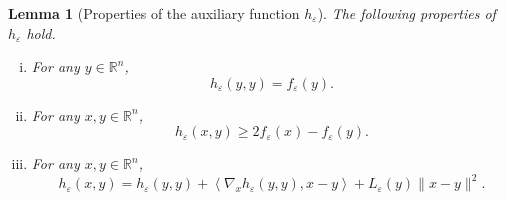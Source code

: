 \documentclass[11pt]{article}
\numberwithin{equation}{section}
\newtheorem{lemma}{Lemma}[proposition]
\begin{document}
\begin{lemma} [Properties of the auxiliary function $h_{\varepsilon}$]\label{State_h_prop}
The following properties of $h_{\varepsilon}$ hold.
\begin{enumerate}[(i)]
	\item For any $y \in \mathbb{R}^n$, \label{State_h_prop1}
	\begin{equation*}
		h_{\varepsilon}(y,y) = f_{\varepsilon}(y) .
	\end{equation*}
	\item For any $x,y \in \mathbb{R}^n$, \label{State_h_prop2}
	\begin{equation*}
		h_{\varepsilon}(x,y) \geq 2f_{\varepsilon}(x) - f_{\varepsilon}(y) .
	\end{equation*}
	\item For any $x,y \in \mathbb{R}^n$, \label{State_h_prop4}
	\begin{equation*}
		h_{\varepsilon}(x,y) = h_{\varepsilon}(y,y) + \left\langle \nabla_x h_{\varepsilon}(y,y) , x-y \right\rangle + L_{\varepsilon}(y) \|x-y\|^2 .
	\end{equation*}
\end{enumerate}
\end{lemma}
\end{document}
